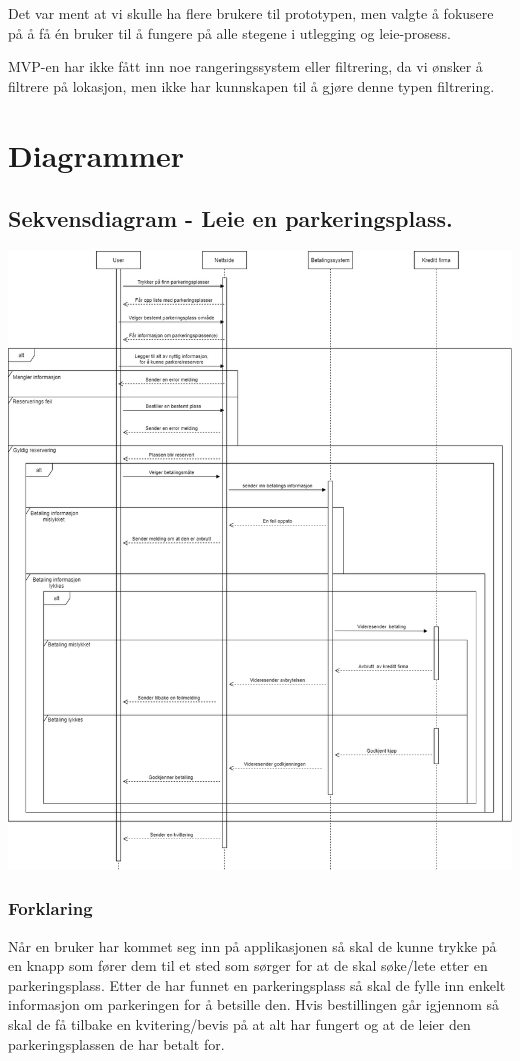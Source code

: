 \documentclass[12pt]{article}
\begin{document}
    Det var ment at vi skulle ha flere brukere til prototypen, men valgte å fokusere på å få én bruker til å fungere på alle stegene i utlegging og leie-prosess.
    
    MVP-en har ikke fått inn noe rangeringssystem eller filtrering, da vi ønsker å filtrere på lokasjon, men ikke har kunnskapen til å gjøre denne typen filtrering.

\section{Diagrammer}
    \subsection{Sekvensdiagram - Leie en parkeringsplass.}
    \includegraphics[max width=\textwidth]{bilder/diagrammer/sekvens_leietaker.png}
            \subsubsection{Forklaring}
            Når en bruker har kommet seg inn på applikasjonen så skal de kunne trykke på en knapp som fører dem til et sted som sørger for at de skal søke/lete etter en parkeringsplass. Etter de har funnet en parkeringsplass så skal de fylle inn enkelt informasjon om parkeringen for å betsille den. Hvis bestillingen går igjennom så skal de få tilbake en kvitering/bevis på at alt har fungert og at de leier den parkeringsplassen de har betalt for.
\end{document}

